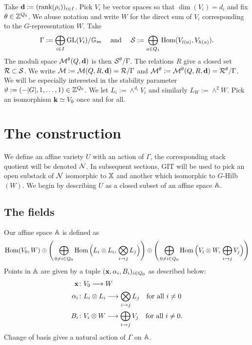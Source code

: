 \documentclass{amsart}
\theoremstyle{definition}
\begin{document}
Take $\mathbf{d}:=(\text{rank}(\rho_i))_{i \in I}$. 
Pick $V_i$ be vector spaces so that $\dim(V_i)=d_i$ and fix $\theta \in \mathbb{Z}^{Q_0}$.
We abuse notation and write $W$ for the direct sum of $V_i$ corresponding to the $G$-representation $W$.
Take $$\Gamma:= \bigoplus_{i \in I} \text{GL}(V_i) / \mathbb{G}_m \quad \text{ and }\quad\mathcal{S}:=\bigoplus_{a \in Q_1} \operatorname{Hom}(V_{t(a)}, V_{h(a)}).$$
The moduli space $\mathcal{M}^\theta(Q,\mathbf{d})$ is then $\mathcal{S}^\theta / \Gamma$.
The relations $R$ give a closed set $\mathcal{R} \subset \mathcal{S}$.
We write $\mathcal{M}:= \mathcal{M}(Q,R,\mathbf{d})=\mathcal{R}/\Gamma$ and $\mathcal{M}^\theta:=\mathcal{M}^\theta(Q,R,\mathbf{d})=\mathcal{R}^\theta/\Gamma$.
We will be especially interested in the stability parameter $\vartheta:= (-|G|,1, \ldots, 1) \in \mathbb{Z}^{Q_0}$.
We let $L_i:= \wedge^{d_i} V_i$ and similarly $L_W:= \wedge^2 W$.
Pick an isomorphism $\mathbf{k} \simeq V_0$ once and for all.


\section{The construction}

We define an affine variety $U$ with an action of $\Gamma$, the corresponding stack quotient will be denoted $\mathcal{N}$.
In subsequent sections, GIT will be used to pick an open substack of $\mathcal{N}$ isomorphic to $\mathbb{X}$ and another which isomorphic to $G$-Hilb$(W)$.
We begin by describing $U$ as a closed subset of an affine space $\mathbb{A}$.

\subsection{The fields}
Our affine space $\mathbb{A}$ is defined as
\begin{equation*}
    \operatorname{Hom}(V_0,W) \oplus \Bigg(\bigoplus_{0\neq i \in Q_0} \operatorname{Hom}\Big(L_i \otimes L_i,\, \bigotimes_{i \rightarrow j} L_j\Big) \Bigg) \oplus  \Bigg(\bigoplus_{0\neq i \in Q_0} \operatorname{Hom}\Big(V_i \otimes W,\, \bigoplus_{i \rightarrow j} V_j\Big) \Bigg)
\end{equation*}
Points in $\mathbb{A}$ are given by a tuple $(\mathbf{x},\alpha_i, B_i)_{i \in Q_0}$ as described below:
\begin{align}
\mathbf{x} \colon &V_0 \longrightarrow W \label{fd:x} \\
\alpha_i \colon &L_i \otimes L_i \longrightarrow \bigotimes_{i \rightarrow j} L_j \quad \text{for all} \,\, i\neq 0 \label{fd:alpha} \\
 B_i \colon &V_i \otimes W \longrightarrow \bigoplus_{i \rightarrow j} V_j \quad \text{for all} \,\, i\neq 0. \label{fd:B}
\end{align}
Change of basis gives a natural action of $\Gamma$ on $\mathbb{A}$.
\end{document}
